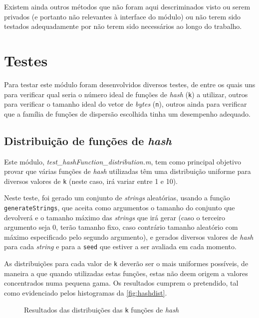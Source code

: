 \documentclass[a4paper,11pt,openright,oneside]{report}
\begin{document}
Existem ainda outros métodos que não foram aqui descriminados visto ou serem privados (e portanto não relevantes à interface do módulo) ou não terem sido testados adequadamente por não terem sido necessários ao longo do trabalho.

\section{Testes}
\label{sec.bloomtests}

Para testar este módulo foram desenvolvidos diversos testes, de entre os quais uns para verificar qual seria o número ideal de funções de \textit{hash} (\texttt{k}) a utilizar, outros para verificar o tamanho ideal do vetor de \textit{bytes} (\texttt{n}), outros ainda para verificar que a família de funções de dispersão escolhida tinha um desempenho adequado.

\subsection{Distribuição de funções de \textit{hash}}
\label{subsec.hashdist}

Este módulo, \textit{test\_hashFunction\_distribution.m}, tem como principal objetivo provar que várias funções de \textit{hash} utilizadas têm uma distribuição uniforme para diversos valores de \texttt{k} (neste caso, irá variar entre 1 e 10).

Neste teste, foi gerado um conjunto de \textit{strings} aleatórias, usando a função \texttt{generateStrings}, que aceita como argumentos o tamanho do conjunto que devolverá e o tamanho máximo das \textit{strings} que irá gerar (caso o terceiro argumento seja $0$, terão tamanho fixo, caso contrário tamanho aleatório com máximo especificado pelo segundo argumento), e gerados diversos valores de \textit{hash} para cada \textit{string} e para a \texttt{seed} que estiver a ser avaliada em cada momento.

As distribuições para cada valor de \texttt{k} deverão ser o mais uniformes possíveis, de maneira a que quando utilizadas estas funções, estas não deem origem a valores concentrados numa pequena gama. Os resultados cumprem o pretendido, tal como evidenciado pelos histogramas da \autoref{fig:hashdist}.

\begin{figure}[ht]
\center
{}
\caption{Resultados das distribuições das \texttt{k} funções de \textit{hash}}
\label{fig:hashdist}
\end{figure}
\end{document}
